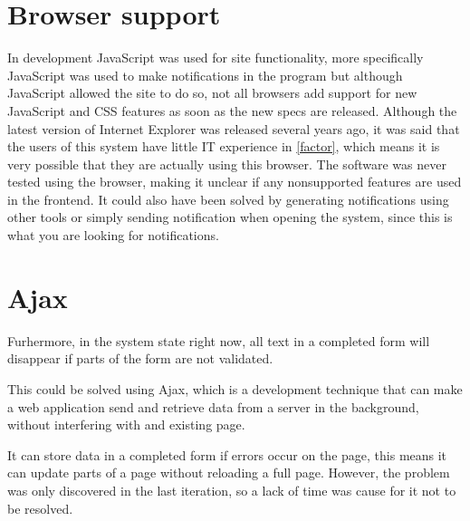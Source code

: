 \section{Browser support}
In development JavaScript was used for site functionality, more specifically JavaScript was used to make notifications in the program but although JavaScript allowed the site to do so, not all browsers add support for new JavaScript and CSS features as soon as the new specs are released.
Although the latest version of Internet Explorer was released several years ago, it was said that the users of this system have little IT experience in \cref{factor}, which means it is very possible that they are actually using this browser.
The software was never tested using the browser, making it unclear if any nonsupported features are used in the frontend.
It could also have been solved by generating notifications using other tools or simply sending notification when opening the system, since this is what you are looking for notifications.

\section{Ajax}

Furhermore, in the system state right now, all text in a completed form will disappear if parts of the form are not validated.

This could be solved using Ajax, which is a development technique that can make a web application send and retrieve data from a server in the background, without interfering with and existing page.

It can store data in a completed form if errors occur on the page, this means it can update parts of a page without reloading a full page.
However, the problem was only discovered in the last iteration, so a lack of time was cause for it not to be resolved.
